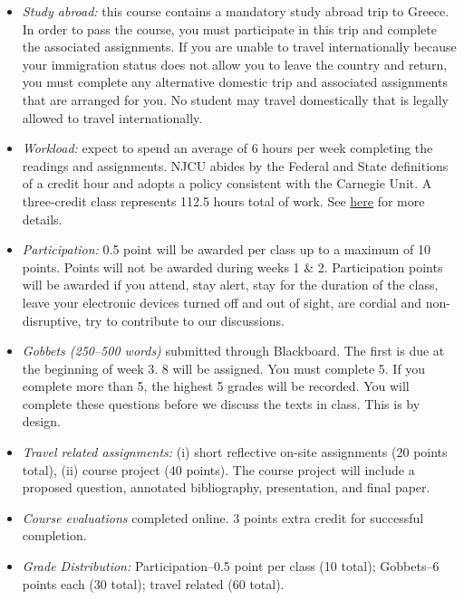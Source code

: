 \documentclass[article,oneside]{memoir}
\begin{document}
\begin{itemize}

\item \textit{Study abroad:} this course contains a mandatory study abroad trip to Greece. In order to pass the course, you must participate in this trip and complete the associated assignments. If you are unable to travel internationally because your immigration status does not allow you to leave the country and return, you must complete any alternative domestic trip and associated assignments that are arranged for you. No student may travel domestically that is legally allowed to travel internationally.  

\item \textit{Workload:} expect to spend an average of 6 hours per week completing the readings and assignments. NJCU abides by the Federal and State definitions of a credit hour and adopts a policy consistent with the Carnegie Unit. A three-credit class represents 112.5 hours total of work. See \href{http://scottoconnor.org/resources/Credit.pdf}{here} for more details.

\item \textit{Participation:} 0.5 point will be awarded per class up to a maximum of 10 points. Points will not be awarded during weeks 1 \& 2. Participation points will be awarded if you attend, stay alert, stay for the duration of the class, leave your electronic devices turned off and out of sight, are cordial and non-disruptive, try to contribute to our discussions. 


\item \textit{Gobbets (250--500 words)} submitted through Blackboard. The first is due at the beginning of week 3. 8 will be assigned. You must complete 5. If you complete more than 5, the highest 5 grades will be recorded. You will complete these questions before we discuss the texts in class. This is by design. 

\item \textit{Travel related assignments:} (i) short reflective on-site assignments (20 points total), (ii) course project (40 points). The course project will include a proposed question, annotated bibliography, presentation, and final paper. 

\item \textit{Course evaluations} completed online. 3 points extra credit for successful completion.





\item \textit{Grade Distribution:} Participation--0.5 point per class (10 total); Gobbets--6 points each (30 total); travel related  (60 total).


\end{itemize}
\end{document}
